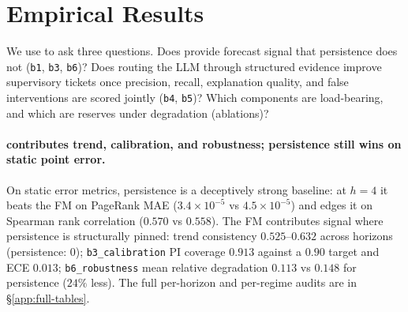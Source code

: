 \section{Empirical Results}
\label{sec:results}

We use \benchname{} to ask three questions. Does \fmname{} provide
forecast signal that persistence does not (\texttt{b1},
\texttt{b3}, \texttt{b6})? Does routing the LLM through structured
evidence improve supervisory tickets once precision, recall,
explanation quality, and false interventions are scored jointly
(\texttt{b4}, \texttt{b5})? Which components are load-bearing, and
which are reserves under degradation (ablations)?

\paragraph{\fmname{} contributes trend, calibration, and robustness; persistence still wins on static point error.}
On static error metrics, persistence is a deceptively strong
baseline: at $h\!=\!4$ it beats the FM on PageRank MAE
($3.4\!\times\!10^{-5}$ vs $4.5\!\times\!10^{-5}$) and edges it on
Spearman rank correlation ($0.570$ vs $0.558$). The FM contributes signal where
persistence is structurally pinned: trend consistency
$0.525$--$0.632$ across horizons (persistence: $0$);
\texttt{b3\_calibration} PI coverage $0.913$ against a $0.90$
target and ECE $0.013$; \texttt{b6\_robustness} mean relative
degradation $0.113$ vs $0.148$ for persistence ($24\%$ less). The
full per-horizon and per-regime audits are in
\S\ref{app:full-tables}.

